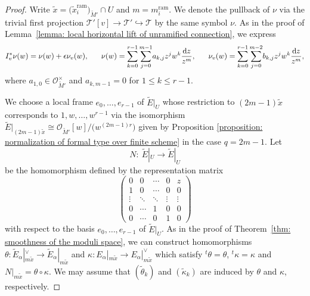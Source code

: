 \documentclass[pdftex]{sigma}
\numberwithin{equation}{section}
\begin{document}
\begin{proof}
Write $\tilde{x}=\big(\tilde{x}^{\mathrm{ram}}_i\big)_{\tilde{M}'}\cap U$
and $m=m^{\mathrm{ram}}_i$.
We denote the pullback of $\nu$ via the trivial first projection
${\mathcal T}'[v]\longrightarrow {\mathcal T'}\hookrightarrow {\mathcal T}$
by the same symbol $\nu$.
As in the proof of Lemma~\ref{lemma: local horizontal lift of unramified connection},
we express
\begin{gather*}
 I_v^*\nu(w)=
 \nu(w)+\epsilon \nu_v(w),
 \qquad\!\!
 \nu(w)
 =
 \sum_{k=0}^{r-1}\sum_{j=0}^{m-1}\!a_{k,j}z^j w^k \frac{{\rm d}z}{z^m},
 \qquad\!\!
 \nu_v(w)
 =
 \sum_{k=0}^{r-1}\sum_{j=0}^{m-2}\!b_{k,j}z^j w^k \frac{{\rm d}z}{z^m},
\end{gather*}
where $a_{1,0}\in {\mathcal O}_{\tilde{M}'}^{\times}$ and
$a_{k,m-1}=0$ for $1\leq k\leq r-1$.

We choose a local frame
$e_0,\dots,e_{r-1}$ of $\tilde{E}|_U$
whose restriction to $(2m-1)\tilde{x}$ corresponds to
$1,w,\dots,w^{r-1}$
via the isomorphism
$\tilde{E}|_{(2m-1)\tilde{x}}\cong {\mathcal O}_{\tilde{M}'}[w]/\big(w^{(2m-1)r}\big)$
given by Proposition \ref{proposition: normalization of formal type over finite scheme}
in the case $q=2m-1$.
Let
\[
 N\colon \ \tilde{E}|_U \longrightarrow \tilde{E}|_U
\]
be the homomorphism
defined by the representation matrix
\begin{equation} \label{equation: representation matrix of N}
 \begin{pmatrix}
 0 & 0 & \cdots & 0 & z \\
 1 & 0 & \cdots & 0 & 0 \\
 \vdots & \ddots & \ddots & \vdots & \vdots \\
 0 & \cdots & 1 & 0 & 0 \\
 0 & \cdots & 0 & 1 & 0
 \end{pmatrix}
\end{equation}
with respect to the basis
$e_0,\dots,e_{r-1}$ of $\tilde{E}|_U$.
As in the proof of Theorem~\ref{thm: smoothness of the moduli space},
we can construct homomorphisms
$\theta\colon \tilde{E}_{\alpha}|_{m\tilde{x}}^{\vee}
\longrightarrow \tilde{E}_{\alpha}|_{m\tilde{x}}$
and
$\kappa\colon E_{\alpha}|_{m\tilde{x}}
\longrightarrow E_{\alpha}|_{m\tilde{x}}^{\vee}$
which satisfy
$^t\theta=\theta$, $^t\kappa=\kappa$ and
$N|_{m\tilde{x}}=\theta\circ\kappa$.
We may assume that $(\tilde{\theta}_k)$ and $(\tilde{\kappa}_k)$ are induced by
$\theta$ and $\kappa$, respectively.


\end{proof}
\end{document}
